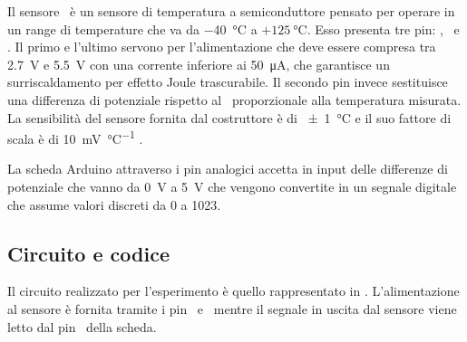             Il sensore \tmp\ è un sensore di temperatura a semiconduttore pensato per operare in un range di temperature che va da \SI{-40}{\celsius} a $+\SI{125}{\celsius}$. Esso presenta tre pin: \vs, \vout\ e \gnd. Il primo e l'ultimo servono per l'alimentazione che deve essere compresa tra \SI{2.7}{\volt} e \SI{5.5}{\volt} con una corrente inferiore ai \SI{50}{\micro\ampere}, che garantisce un surriscaldamento per effetto Joule trascurabile. Il secondo pin invece sestituisce una differenza di potenziale rispetto al \gnd\ proporzionale alla temperatura misurata. La sensibilità del sensore fornita dal costruttore è di \SI{\pm 1}{\celsius} e il suo fattore di scala è di \SI{10}{\milli\volt\per\celsius}  \cite{tmp36-datasheet}.

            La scheda Arduino attraverso i pin analogici accetta in input delle differenze di potenziale che vanno da \SI{0}{V} a \SI{5}{V} che vengono convertite in un segnale digitale che assume valori discreti da \num{0} a \num{1023}.
        \subsection{Circuito e codice}\label{ard:codice}
            Il circuito realizzato per l'esperimento è quello rappresentato in . L'alimentazione al sensore è fornita tramite i pin \pinV\ e \gnd\ mentre il segnale in uscita dal sensore viene letto dal pin \sensorpin\ della scheda.

